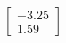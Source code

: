 \documentclass[preview]{standalone}
\begin{document}
\begin{align*}
\begin{bmatrix} -3.25 \\ 1.59 \end{bmatrix}
\end{align*}
\end{document}
